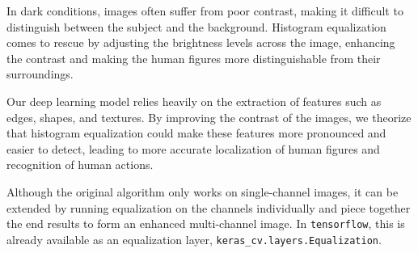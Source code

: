\documentclass[letterpaper]{article} %
\begin{document}
In dark conditions, images often suffer from poor contrast, 
making it difficult to distinguish between the subject and the background. 
Histogram equalization comes to rescue by 
adjusting the brightness levels across the image, 
enhancing the contrast and making the human figures 
more distinguishable from their surroundings.

Our deep learning model relies heavily 
on the extraction of features such as edges, shapes, and textures. 
By improving the contrast of the images, 
we theorize that histogram equalization could 
make these features more pronounced and easier to detect, 
leading to more accurate 
localization of human figures and recognition of human actions.

Although the original algorithm only works on single-channel images, 
it can be extended by running equalization on the channels individually
and piece together the end results to form an enhanced multi-channel image.
In \lstinline|tensorflow|, this is already
available as an equalization layer, 
\lstinline|keras_cv.layers.Equalization|.
\end{document}
